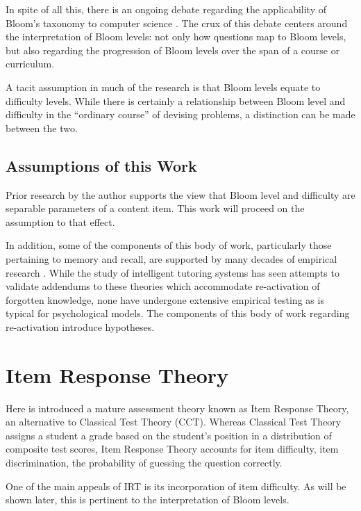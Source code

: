 In spite of all this, there is an ongoing debate regarding the applicability of
Bloom's taxonomy to computer science \cite{johnson2006bloom,
fuller2007developing, thompson2008bloom}.  The crux of this debate centers
around the interpretation of Bloom levels: not only how questions map to Bloom
levels, but also regarding the progression of Bloom levels over the span of a
course or curriculum.  

A tacit assumption in much of the research is that Bloom levels equate to
difficulty levels.  While there is certainly a relationship between Bloom level
and difficulty in the ``ordinary course'' of devising problems, a distinction
can be made between the two.

\subsection{Assumptions of this Work}

Prior research by the author supports the view that Bloom level and difficulty
are separable parameters of a content item.  This work will proceed on the
assumption to that effect. 

In addition, some of the components of this body of work, particularly those
pertaining to memory and recall, are supported by many decades of empirical
research \cite{ebbinghaus}.  While the study of intelligent tutoring systems
has seen attempts to validate addendums to these theories which accommodate
re-activation of forgotten knowledge, none have undergone extensive empirical
testing as is typical for psychological models.  The components of this body of
work regarding re-activation introduce hypotheses.

\section{Item Response Theory}

Here is introduced a mature assessment theory known as Item Response Theory, an
alternative to Classical Test Theory (CCT).  Whereas Classical Test Theory
assigns a student a grade based on the student's position in a distribution of
composite test scores, Item Response Theory accounts for item difficulty, item
discrimination, the probability of guessing the question correctly.

One of the main appeals of IRT is its incorporation of item difficulty.  As
will be shown later, this is pertinent to the interpretation of Bloom levels.  


